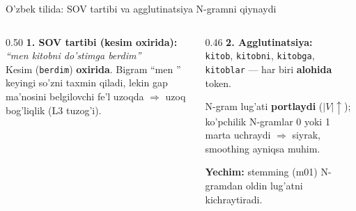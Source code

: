 \documentclass[aspectratio=169,11pt]{beamer}
\begin{document}
\begin{frame}{O'zbek tilida: SOV tartibi va agglutinatsiya N-gramni qiynaydi}
  \begin{columns}[T]
    \begin{column}{0.50\textwidth}
      \textbf{1. SOV tartibi (kesim oxirida):}\\[3pt]
      \small
      \textit{``men kitobni do'stimga berdim''}\\[3pt]
      Kesim (\texttt{berdim}) \textbf{oxirida}. Bigram ``men \underline{\hspace{0.6cm}}'' keyingi
      so'zni taxmin qiladi, lekin gap ma'nosini belgilovchi fe'l uzoqda
      $\Rightarrow$ uzoq bog'liqlik (L3 tuzog'i).
    \end{column}
    \begin{column}{0.46\textwidth}
      \textbf{2. Agglutinatsiya:}\\[3pt]
      \small
      \texttt{kitob}, \texttt{kitobni}, \texttt{kitobga}, \texttt{kitoblar} ---
      har biri \textbf{alohida} token.\\[4pt]
      \begin{tcolorbox}[warnbox,title=Oqibat,top=2pt,bottom=2pt]
        \footnotesize
        N-gram lug'ati \textbf{portlaydi} ($|V|\uparrow$); ko'pchilik
        N-gramlar 0 yoki 1 marta uchraydi $\Rightarrow$ siyrak, smoothing
        ayniqsa muhim.
      \end{tcolorbox}
      \vspace{2pt}
      \footnotesize\textbf{Yechim:} stemming (m01) N-gramdan oldin lug'atni kichraytiradi.
    \end{column}
  \end{columns}
\end{frame}
\end{document}
